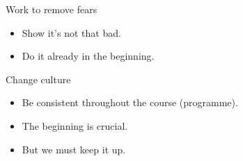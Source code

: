\begin{frame}
  \begin{block}{Work to remove fears}
    \begin{itemize}
      \item Show it's not that bad.
      \item Do it already in the beginning.
    \end{itemize}
  \end{block}

  \pause

  \begin{block}{Change culture}
    \begin{itemize}
      \item Be consistent throughout the course (programme).
      \item The beginning is crucial.
      \item But we must keep it up.
    \end{itemize}
  \end{block}
\end{frame}
